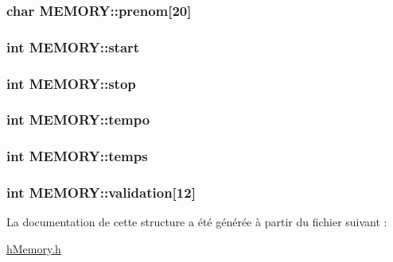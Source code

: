 \subsubsection[{\texorpdfstring{prenom}{prenom}}]{\setlength{\rightskip}{0pt plus 5cm}char M\+E\+M\+O\+R\+Y\+::prenom\mbox{[}20\mbox{]}}\hypertarget{struct_m_e_m_o_r_y_a198da4f63995c7110ed3e42fdc32f7d9}{}\label{struct_m_e_m_o_r_y_a198da4f63995c7110ed3e42fdc32f7d9}
\subsubsection[{\texorpdfstring{start}{start}}]{\setlength{\rightskip}{0pt plus 5cm}int M\+E\+M\+O\+R\+Y\+::start}\hypertarget{struct_m_e_m_o_r_y_a29f694b7714a58d55e9b7c06480c9b93}{}\label{struct_m_e_m_o_r_y_a29f694b7714a58d55e9b7c06480c9b93}
\subsubsection[{\texorpdfstring{stop}{stop}}]{\setlength{\rightskip}{0pt plus 5cm}int M\+E\+M\+O\+R\+Y\+::stop}\hypertarget{struct_m_e_m_o_r_y_aeebed2e935c7e36b7ee23a5f699dae0b}{}\label{struct_m_e_m_o_r_y_aeebed2e935c7e36b7ee23a5f699dae0b}
\subsubsection[{\texorpdfstring{tempo}{tempo}}]{\setlength{\rightskip}{0pt plus 5cm}int M\+E\+M\+O\+R\+Y\+::tempo}\hypertarget{struct_m_e_m_o_r_y_a4f79ed479e9443011fb8aae0244fadd0}{}\label{struct_m_e_m_o_r_y_a4f79ed479e9443011fb8aae0244fadd0}
\subsubsection[{\texorpdfstring{temps}{temps}}]{\setlength{\rightskip}{0pt plus 5cm}int M\+E\+M\+O\+R\+Y\+::temps}\hypertarget{struct_m_e_m_o_r_y_a7d203f387ea4eb67c8102e8e87ff8fd1}{}\label{struct_m_e_m_o_r_y_a7d203f387ea4eb67c8102e8e87ff8fd1}
\subsubsection[{\texorpdfstring{validation}{validation}}]{\setlength{\rightskip}{0pt plus 5cm}int M\+E\+M\+O\+R\+Y\+::validation\mbox{[}12\mbox{]}}\hypertarget{struct_m_e_m_o_r_y_ad6bce5091c086d15a76e7d0610a01507}{}\label{struct_m_e_m_o_r_y_ad6bce5091c086d15a76e7d0610a01507}


La documentation de cette structure a été générée à partir du fichier suivant \+:\begin{DoxyCompactItemize}
\item 
\hyperlink{h_memory_8h}{h\+Memory.\+h}\end{DoxyCompactItemize}
